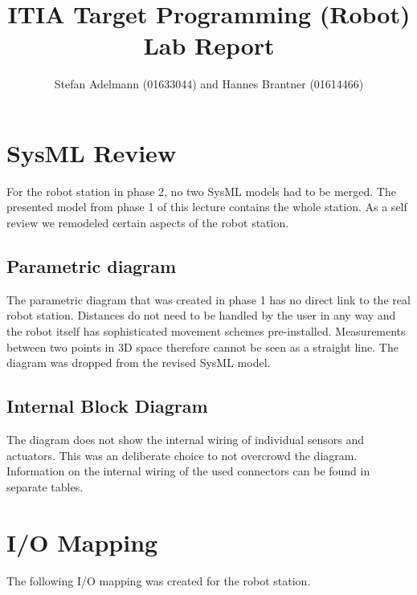 \documentclass{article}
\title{ITIA Target Programming (Robot) Lab Report}
\author{Stefan Adelmann (01633044) and Hannes Brantner (01614466)}
\begin{document}
\maketitle{}
\clearpage{}
\section{SysML Review}
For the robot station in phase 2, no two SysML models had to be merged. The presented model from phase 1 of this lecture contains the whole station. As a self review we remodeled certain aspects of the robot station.

\subsection{Parametric diagram}
The parametric diagram that was created in phase 1 has no direct link to the real robot station. Distances do not need to be handled by the user in any way and the robot itself has sophisticated movement schemes  pre-installed. Measurements between two points in 3D space therefore cannot be seen as a straight line. The diagram was dropped from the revised SysML model.

\subsection{Internal Block Diagram}
The diagram does not show the internal wiring of individual sensors and actuators. This was an deliberate choice to not overcrowd the diagram. Information on the internal wiring of the used connectors can be found in separate tables.


\section{I/O Mapping}
The following I/O mapping was created for the robot station.
\end{document}
